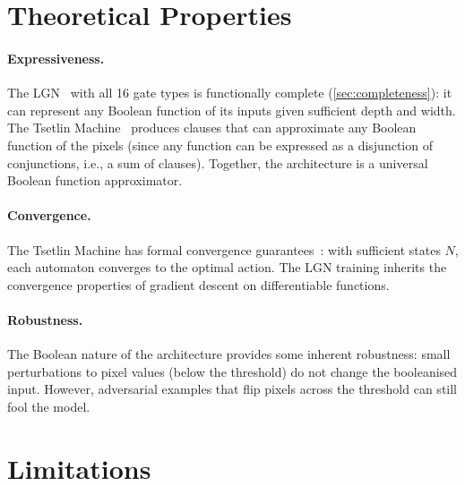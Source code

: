 \section{Theoretical Properties}
\label{sec:theory}

\paragraph{Expressiveness.}
The LGN~\cite{petersen2024difflogic} with all 16 gate types is functionally complete
(\cref{sec:completeness}): it can represent any Boolean function of
its inputs given sufficient depth and width. The Tsetlin Machine~\cite{granmo2018tsetlin}
produces clauses that can approximate any Boolean function of the
pixels (since any function can be expressed as a disjunction of
conjunctions, i.e., a sum of clauses). Together, the architecture
is a universal Boolean function approximator.

\paragraph{Convergence.}
The Tsetlin Machine has formal convergence
guarantees~\cite{zhang2021convergence}: with sufficient states $N$,
each automaton converges to the optimal action. The LGN training
inherits the convergence properties of gradient descent on
differentiable functions.

\paragraph{Robustness.}
The Boolean nature of the architecture provides some inherent
robustness: small perturbations to pixel values (below the threshold)
do not change the booleanised input. However, adversarial examples
that flip pixels across the threshold can still fool the model.


\section{Limitations}
\label{sec:limitations}

